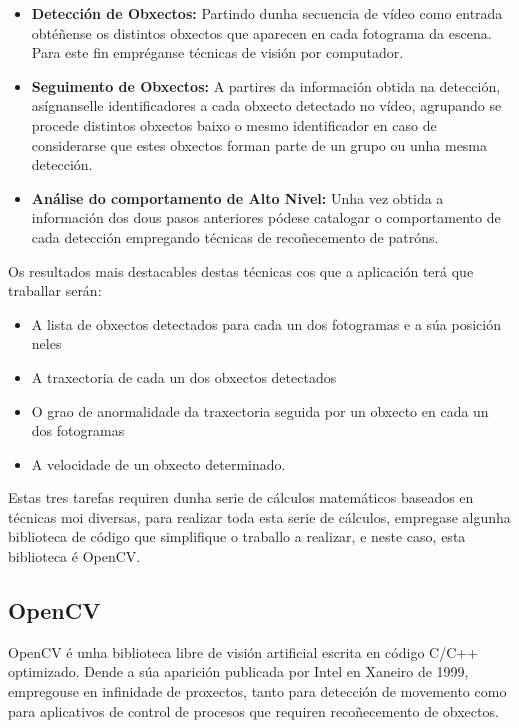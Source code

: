 	\begin{itemize}
	
		\item{\textbf{Detección de Obxectos:}}\label{cap:DeteccionObxetos} Partindo dunha secuencia de vídeo como 
		entrada obtéñense os distintos obxectos que aparecen en cada fotograma da escena.
		Para este fin empréganse técnicas de visión por computador.
		
		
		\item{\textbf{Seguimento de Obxectos:}} A partires da información obtida na detección, asígnanselle 
		identificadores a cada obxecto detectado no vídeo, agrupando se procede distintos
		obxectos baixo o mesmo identificador en caso de considerarse que estes obxectos forman
		parte de un grupo ou unha mesma detección.
		
		
		\item{\textbf{Análise do comportamento de Alto Nivel:}} Unha vez obtida a información dos 
		dous pasos anteriores pódese catalogar o comportamento de cada detección empregando
		técnicas de recoñecemento de patróns.
	
	\end{itemize}	
	
	Os resultados mais destacables destas técnicas cos que a aplicación terá que traballar serán:
	\begin{itemize}
		\item A lista de obxectos detectados para cada un dos fotogramas e a súa posición neles
		\item A traxectoria de cada un dos obxectos detectados
		\item O grao de anormalidade da traxectoria seguida por un obxecto en cada un dos fotogramas
		\item A velocidade de un obxecto determinado.
	\end{itemize}
	
	Estas tres tarefas requiren dunha serie de cálculos matemáticos baseados en técnicas moi diversas,
	para realizar toda esta serie de cálculos, empregase algunha biblioteca de código que simplifique 
	o traballo a realizar, e neste caso, esta biblioteca é OpenCV.
	
	\subsection{OpenCV}
		OpenCV é unha biblioteca libre de visión artificial escrita en código C/C++ optimizado.
		Dende a súa aparición publicada por Intel en Xaneiro de 1999, empregouse en infinidade 
		de proxectos, tanto para detección de movemento como para aplicativos de control de procesos
		que requiren recoñecemento de obxectos.
		
